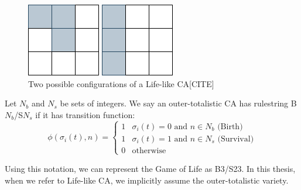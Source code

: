 \begin{figure}[!h]
  \centering
  \begin{minipage}{.4\textwidth}
    \centering
    \includegraphics[width=.4\linewidth]{images/moore_1.png}
  \end{minipage}%
  \begin{minipage}{.4\textwidth}
    \centering
    \includegraphics[width=.4\linewidth]{images/moore_2.png}
  \end{minipage}
  \caption{Two possible configurations of a Life-like CA[CITE]}
  \label{fig:two-moores}
\end{figure}

\begin{definition}
Let $N_b$ and $N_s$ be sets of integers. We say an outer-totalistic CA has rulestring \textnormal{B$N_b$/S$N_s$} if it has transition function:
\[
  \phi(\sigma_i(t), n) = 
  \begin{cases}
    1 & \sigma_i(t) = 0 \text{ and } n \in N_b \text{  (Birth)}\\
    1 & \sigma_i(t) = 1 \text{ and } n \in N_s \text{  (Survival)}\\
    0 & \text{otherwise}
  \end{cases}
\]
\end{definition}

Using this notation, we can represent the Game of Life as B3/S23. In this thesis, when we refer to Life-like CA, we implicitly assume the outer-totalistic variety.


